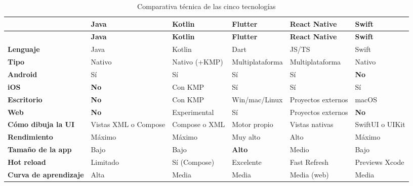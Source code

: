 \documentclass[11pt,a4paper]{article}
\begin{document}
	{\footnotesize
		\begin{xltabular}{\textwidth}{@{}>{\RaggedRight\arraybackslash}p{2.5cm} >{\RaggedRight\arraybackslash}X >{\RaggedRight\arraybackslash}X >{\RaggedRight\arraybackslash}X >{\RaggedRight\arraybackslash}X >{\RaggedRight\arraybackslash}X@{}}
			\caption{Comparativa técnica de las cinco tecnologías}\label{tab:tec-comparativa}\\
			\toprule
			\textcolor{paper}{\sffamily\bfseries} & \textcolor{paper}{\sffamily\bfseries Java} & \textcolor{paper}{\sffamily\bfseries Kotlin} & \textcolor{paper}{\sffamily\bfseries Flutter} & \textcolor{paper}{\sffamily\bfseries React Native} & \textcolor{paper}{\sffamily\bfseries Swift} \\
			\midrule
			\endfirsthead
			\toprule
			\textcolor{paper}{\sffamily\bfseries} & \textcolor{paper}{\sffamily\bfseries Java} & \textcolor{paper}{\sffamily\bfseries Kotlin} & \textcolor{paper}{\sffamily\bfseries Flutter} & \textcolor{paper}{\sffamily\bfseries React Native} & \textcolor{paper}{\sffamily\bfseries Swift} \\
			\midrule
			\endhead
			\bottomrule
			\endlastfoot
			\textbf{Lenguaje} & Java & Kotlin & Dart & JS/TS & Swift \\
			\textbf{Tipo} & Nativo & Nativo (+KMP) & Multiplataforma & Multiplataforma & Nativo \\
			\textbf{Android} & Sí & Sí & Sí & Sí & \textbf{No} \\
			\textbf{iOS} & \textbf{No} & Con KMP & Sí & Sí & Sí \\
			\textbf{Escritorio} & \textbf{No} & Con KMP & Win/mac/Linux & Proyectos externos & macOS \\
			\textbf{Web} & \textbf{No} & Experimental & Sí & Proyectos externos & \textbf{No} \\
			\textbf{Cómo dibuja la UI} & Vistas XML o Compose & Compose o XML & Motor propio & Vistas nativas & SwiftUI o UIKit \\
			\textbf{Rendimiento} & Máximo & Máximo & Muy alto & Alto & Máximo \\
			\textbf{Tamaño de la app} & Bajo & Bajo & \textbf{Alto} & Medio & Bajo \\
			\textbf{Hot reload} & Limitado & Sí (Compose) & Excelente & Fast Refresh & Previews Xcode \\
			\textbf{Curva de aprendizaje} & Alta & Media & Media & Media (web) & Media \\
			\end{xltabular}
	}
	
\end{document}
